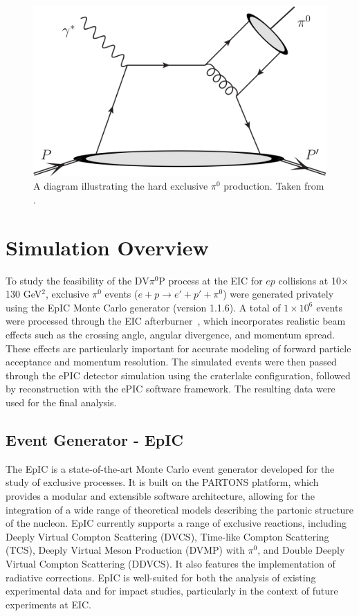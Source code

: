 \documentclass[letterpaper,12pt]{article}
\begin{document}
\begin{figure}[h]
    \centering
    \includegraphics[scale=0.07]{Figures/exclusive_pi0_feynman.pdf}
    \caption{A diagram illustrating the hard exclusive $\pi^0$ production. Taken from \cite{PhysRevLett.133.051901}.}
\label{fig:dvpi0p}
\end{figure}

\section{Simulation Overview}\label{sec:Sim_Overview}
To study the feasibility of the DV$\pi^{0}$P process at the EIC for $ep$ collisions at 10$\times$130 GeV$^2$, exclusive $\pi^{0}$ events ($e + p \rightarrow e' + p' + \pi^0$) were generated privately using the EpIC Monte Carlo generator (version 1.1.6). A total of $1 \times 10^6$ events were processed through the EIC afterburner~\cite{afterburner_github}, which incorporates realistic beam effects such as the crossing angle, angular divergence, and momentum spread. These effects are particularly important for accurate modeling of forward particle acceptance and momentum resolution. The simulated events were then passed through the ePIC detector simulation using the craterlake configuration, followed by reconstruction with the ePIC software framework. The resulting data were used for the final analysis.

\subsection{Event Generator - EpIC}\label{subsec:EvGen}
The EpIC\cite{Aschenauer:2022aeb, web_EpIC} is a state-of-the-art Monte Carlo event generator developed for the study of exclusive processes. It is built on the PARTONS platform\cite{Berthou:2015oaw, link_to_PARTONS}, which provides a modular and extensible software architecture, allowing for the integration of a wide range of theoretical models describing the partonic structure of the nucleon. EpIC currently supports a range of exclusive reactions, including Deeply Virtual Compton Scattering (DVCS), Time-like Compton Scattering (TCS), Deeply Virtual Meson Production (DVMP) with $\pi^{0}$, and Double Deeply Virtual Compton Scattering (DDVCS). It also features the implementation of radiative corrections. EpIC is well-suited for both the analysis of existing experimental data and for impact studies, particularly in the context of future experiments at EIC\cite{aschenauer2025studydeeplyvirtualcompton}.
\end{document}
